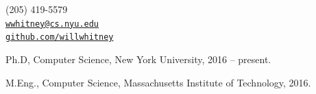 \documentclass[11pt,article,oneside]{memoir}
\makeatletter
\def\myemail{wwhitney@cs.nyu.edu}
\def\myweb{github.com/willwhitney}
\def\myphone{(205) 419-5579}
\def\mytwitter{@wfwhitney}
\makeatother
\begin{document}
\begin{minipage}[t]{2.95in}

\end{minipage}
\hfill
\hfill
\begin{minipage}[t]{1.6in}
  \flushright \footnotesize  \addressblock \myphone \, \faPhone \\
  {\scriptsize  \texttt{\href{mailto:\myemail}{\myemail}} \, \faEnvelope} \\
  {\scriptsize  \texttt{\href{https://\myweb}{\myweb}} \, \faGithub}
\end{minipage}

\medskip

\reversemarginpar

\bigskip


%
%
%
%
%

\bigskip




\ind Ph.D, Computer Science, New York University, 2016 -- present.

\ind M.Eng., Computer Science, Massachusetts Institute of Technology, 2016.
\end{document}
